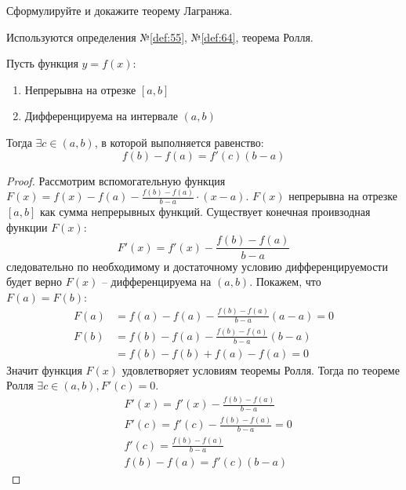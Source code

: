 \begin{question}
    Сформулируйте и докажите теорему Лагранжа.
\end{question}
\begin{used}
    Используются определения №\ref{def:55}, №\ref{def:64}, теорема Ролля.
\end{used}
\begin{theorem}
    Пусть функция $y = f(x)$:
    \begin{enumerate}
        \item Непрерывна на отрезке $[a, b]$
        \item Дифференцируема на интервале  $(a, b)$
    \end{enumerate}
    Тогда $\exists  c \in (a, b)$, в которой выполняется равенство: \[
        f(b) - f(a) = f'(c)(b - a)
    \] 
\end{theorem}
\begin{proof}
    Рассмотрим вспомогательную функция $F(x) = f(x) - f(a) - \frac{f(b) - f(a)}{b - a} \cdot (x - a)$. 
    $F(x)$ непрерывна на отрезке $[a, b]$ как сумма непрерывных функций. Существует конечная проивзодная функции $F(x)$: \[
        F'(x) = f'(x) - \frac{f(b) - f(a)}{b - a}
    \]
    следовательно по необходимому и достаточному условию дифференцируемости будет верно $F(x)$ -- дифференцируема на $(a, b)$.
    Покажем, что $F(a) = F(b)$:
    \begin{align*}
        F(a) &= f(a) - f(a) - \frac{f(b) - f(a)}{b - a}(a - a) = 0 \\
        F(b) &= f(b) - f(a) - \frac{f(b) - f(a)}{b - a}(b - a) \\
             &= f(b) - f(b) + f(a) - f(a) = 0
    \end{align*}
    Значит функция $F(x)$ удовлетворяет условиям теоремы Ролля. Тогда по теореме Ролля  $\exists c \in (a, b), F'(c) = 0$.
    \begin{align*}
        & F'(x) = f'(x) - \frac{f(b) - f(a)}{b - a} \\
        & F'(c) = f'(c) - \frac{f(b) - f(a)}{b - a} = 0 \\
        & f'(c) = \frac{f(b) - f(a)}{b - a} \\
        & f(b) - f(a) = f'(c) (b - a)
    \end{align*}
\end{proof}
\pagebreak



